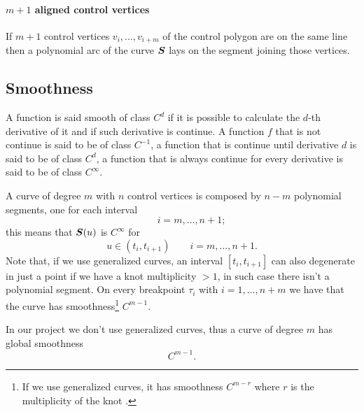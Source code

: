 \documentclass[dissertation.tex]{subfiles}
\begin{document}
\paragraph{$m+1$ aligned control vertices}
If $m+1$ control vertices $v_i,\dots,v_{i+m}$ of the control polygon
are on the same line then a polynomial arc of the curve $\boldsymbol{S}$
lays on the segment joining those vertices.

\subsection{Smoothness}\label{sec:smoothness}
A function is said smooth of class $C^d$ if it is possible to
calculate the $d$-th derivative of it and if such derivative is
continue. A function $f$ that is not continue is said to be of class
$C^{-1}$, a function that is continue until derivative $d$ is said to
be of class $C^d$, a function that is always continue for every
derivative is said to be of class $C^\infty$.

A \bs curve of degree $m$ with $n$ control vertices is composed by
$n-m$ polynomial segments, one for each 
interval 
\begin{equation*}
[t_i,t_{i+1}]\qquad i=m,\dots,n+1;
\end{equation*}
this means that $\boldsymbol{S}(u)$ is $C^\infty$ for
\begin{equation*}
u\in(t_i,t_{i+1})\qquad i=m,\dots,n+1.
\end{equation*}
Note that, if we use generalized \bs curves, an interval
$[t_i,t_{i+1}]$ can also degenerate in just a point if
we have a knot multiplicity $>1$, in
such case there isn't a polynomial segment.
On every breakpoint $\tau_i$ with $i=1,\dots,n+m$ we have that the curve has
smoothness\footnote{If we use generalized \bs curves, it has
  smoothness $C^{m-r}$ where $r$ is the
multiplicity of the knot \cite{farin}.} $C^{m-1}$.

In our project we don't use generalized \bs curves, thus a
curve of degree $m$ has global smoothness
\begin{equation*}
  C^{m-1}.
\end{equation*}
\end{document}

